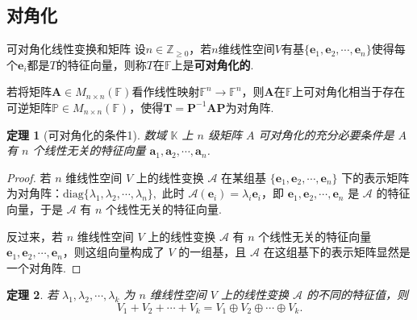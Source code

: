 \documentclass[12pt, a4paper]{ctexart}
\newtheorem{theorem}{\indent 定理}[subsection]
\begin{document}
\subsection{对角化}
\begin{definition}{可对角化线性变换和矩阵}{}
	设$n\in\mathbb Z_{\geq0}$，若$n$维线性空间$V$有基$\{\bm  e_1,\bm e_2,\cdots,\bm  e_n\}$使得每个$\bm e_i$都是$T$的特征向量，则称$T$在$\mathbb F$上是\textbf{可对角化的}.
	
	若将矩阵$\bm A\in M_{n\times n}(\mathbb F)$看作线性映射$\mathbb F^{n}\to\mathbb F^{n}$，则$\bm A$在$\mathbb F$上可对角化相当于存在可逆矩阵$\mathbb P\in M_{n\times n}(\mathbb F)$，使得$\bm T=\bm  P^{-1}\bm{AP}$为对角阵. 
\end{definition}
\begin{tcolorbox}[pikachu]
	\begin{theorem}[可对角化的条件1]
		数域 $  \mathbb K $ 上 $ n $ 级矩阵 $ A $ 可对角化的充分必要条件是 $ A $ 有 $ n $ 个线性无关的特征向量 $ \boldsymbol{a}_1, \boldsymbol{a}_2, \cdots, \boldsymbol{a}_n $. 
	\end{theorem}
\end{tcolorbox}
\begin{proof}
	若 $ n $ 维线性空间 $ V $ 上的线性变换 $ \mathcal{A} $ 在某组基 $ \{\bm e_1, \bm e_2, \cdots, \bm e_n\} $ 下的表示矩阵为对角阵：$\mathrm{diag}\{\lambda_1,\lambda_2,\cdots,\lambda_n\},$ 此时 $ \mathcal{A}(\bm e_i) = \lambda_i\bm e_i $，即 $ \bm e_1, \bm e_2, \cdots, \bm e_n $ 是 $ \mathcal{A} $ 的特征向量，于是 $ \mathcal{A} $ 有 $ n $ 个线性无关的特征向量. 
	
	反过来，若 $ n $ 维线性空间 $ V $ 上的线性变换 $ \mathcal{A} $ 有 $ n $ 个线性无关的特征向量 $\bm e_1, \bm e_2, \cdots, \bm e_n $，则这组向量构成了 $ V $ 的一组基，且 $ \mathcal{A} $ 在这组基下的表示矩阵显然是一个对角阵. 
\end{proof}
\begin{tcolorbox}[pikachu]
	\begin{theorem}\label{thm:eigenvalue-oplus}
		若 $ \lambda_1, \lambda_2, \cdots, \lambda_k $ 为 $ n $ 维线性空间 $ V $ 上的线性变换 $ \mathcal{A} $ 的不同的特征值，则
		\[
		V_1 + V_2 + \cdots + V_k = V_1 \oplus V_2 \oplus \cdots \oplus V_k.
		\]
	\end{theorem}
\end{tcolorbox}
\end{document}
